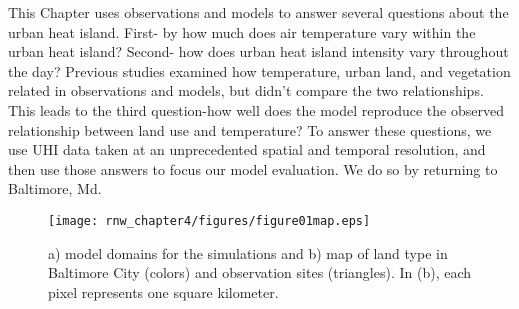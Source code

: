 This Chapter uses observations and models to answer several questions about the urban heat island. 
 First- by how much does air temperature vary within the urban heat island? Second- how does urban heat island intensity vary throughout the day? Previous studies examined how temperature, urban land, and vegetation related in observations and models, but didn't compare the two relationships. This leads to the third question-how well does the model reproduce the observed relationship between land use and temperature? 
To answer these questions,
 we use UHI data taken at an unprecedented spatial and temporal resolution, and then use those answers to focus our model evaluation.    
We do so by returning to Baltimore, Md.%

\begin{figure}[h]
\centering
\texttt{[image: rnw\_chapter4/figures/figure01map.eps]}
\caption{a) model domains for the simulations and b) map of land type in Baltimore City (colors) and observation sites (triangles). In (b), each pixel represents one square kilometer.}
\label{fig:map}
 \end{figure}
 
